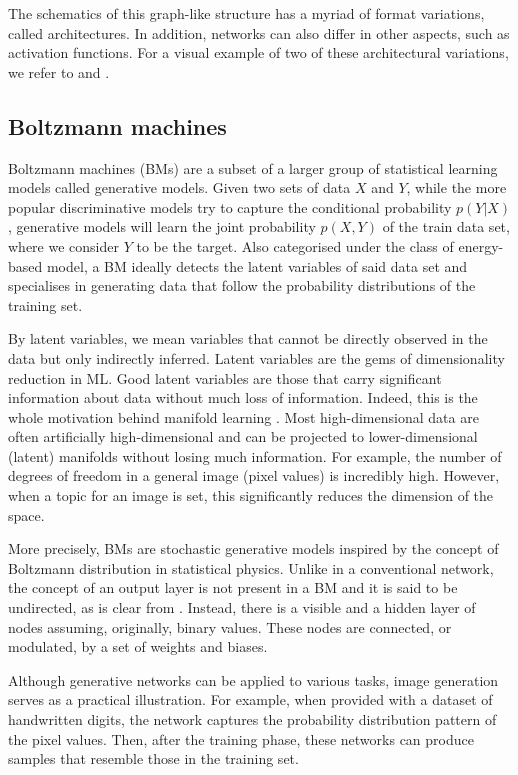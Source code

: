The schematics of this graph-like structure has a myriad of format variations, called architectures. In addition, networks can also differ in other aspects, such as activation functions. For a visual example of two of these architectural variations, we refer to  and . 

\subsection{Boltzmann machines}
Boltzmann machines (BMs) are a subset of a larger group of statistical learning models called generative models. Given two sets of data $X$ and $Y$, while the more popular discriminative models try to capture the conditional probability $p(Y | X)$, generative models will learn the joint probability $p(X, Y)$ of the train data set, where we consider $Y$ to be the target. Also categorised under the class of energy-based model, a BM ideally detects the latent variables of said data set and specialises in generating data that follow the probability distributions of the training set. 

By latent variables, we mean variables that cannot be directly observed in the data but only indirectly inferred. Latent variables are the gems of dimensionality reduction in ML. Good latent variables are those that carry significant information about data without much loss of information. Indeed, this is the whole motivation behind manifold learning \cite{manifoldlearning}. Most high-dimensional data are often artificially high-dimensional and can be projected to lower-dimensional (latent) manifolds without losing much information. For example, the number of degrees of freedom in a general image (pixel values) is incredibly high. However, when a topic for an image is set, this significantly reduces the dimension of the space.

More precisely, BMs are stochastic generative models inspired by the concept of Boltzmann distribution in statistical physics. Unlike in a conventional network, the concept of an output layer is not present in a BM and it is said to be undirected, as is clear from . Instead, there is a visible and a hidden layer of nodes assuming, originally, binary values. These nodes are connected, or modulated, by a set of weights and biases.  



Although generative networks can be applied to various tasks, image generation serves as a practical illustration. For example, when provided with a dataset of handwritten digits, the network captures the probability distribution pattern of the pixel values. Then, after the training phase, these networks can produce samples that resemble those in the training set. 

